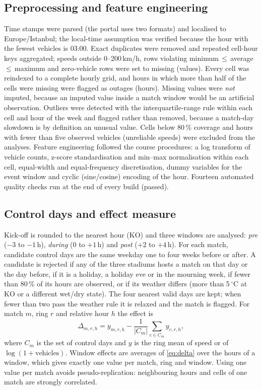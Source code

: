 \documentclass[conference]{IEEEtran}
\begin{document}
\subsection{Preprocessing and feature engineering}
Time stamps were parsed (the portal uses two formats) and localised to Europe/Istanbul; the local-time assumption was verified because the hour with the fewest vehicles is 03:00. Exact duplicates were removed and repeated cell-hour keys aggregated; speeds outside 0--200\,km/h, rows violating minimum\,$\le$\,average\,$\le$\,maximum and zero-vehicle rows were set to missing (\vNInvalid values). Every cell was reindexed to a complete hourly grid, and hours in which more than half of the cells were missing were flagged as outages (\vNOutage hours). Missing values were \emph{not} imputed, because an imputed value inside a match window would be an artificial observation. Outliers were detected with the interquartile-range rule \cite{tukey1977} within each cell and hour of the week and flagged rather than removed, because a match-day slowdown is by definition an unusual value. Cells below 80\,\% coverage and hours with fewer than five observed vehicles (unreliable speeds) were excluded from the analyses. Feature engineering followed the course procedures: a log transform of vehicle counts, z-score standardisation and min--max normalisation within each cell, equal-width and equal-frequency discretisation, dummy variables for the event window and cyclic (sine/cosine) encoding of the hour. Fourteen automated quality checks run at the end of every build (\vQCPassed passed).

\subsection{Control days and effect measure}
Kick-off is rounded to the nearest hour (KO) and three windows are analysed: \emph{pre} ($-3$ to $-1$\,h), \emph{during} (0 to $+1$\,h) and \emph{post} ($+2$ to $+4$\,h). For each match, candidate control days are the same weekday one to four weeks before or after. A candidate is rejected if any of the three stadiums hosts a match on that day or the day before, if it is a holiday, a holiday eve or in the mourning week, if fewer than 80\,\% of its hours are observed, or if its weather differs (more than 5\,$^\circ$C at KO or a different wet/dry state). The four nearest valid days are kept; when fewer than two pass the weather rule it is relaxed and the match is flagged. For match $m$, ring $r$ and relative hour $h$ the effect is
\begin{equation}
\Delta_{m,r,h} = y_{m,r,h} - \frac{1}{|C_m|}\sum_{c\in C_m} y_{c,r,h},
\label{eq:delta}
\end{equation}
where $C_m$ is the set of control days and $y$ is the ring mean of speed or of $\log(1+\text{vehicles})$. Window effects are averages of \eqref{eq:delta} over the hours of a window, which gives exactly one value per match, ring and window. Using one value per match avoids pseudo-replication: neighbouring hours and cells of one match are strongly correlated.
\end{document}
